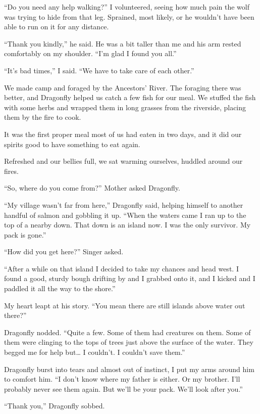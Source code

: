 ``Do you need any help walking?'' I volunteered, seeing how much pain the wolf was trying to hide from that leg. Sprained, most likely, or he wouldn't have been able to run on it for any distance.

``Thank you kindly,'' he said. He was a bit taller than me and his arm rested comfortably on my shoulder. ``I'm glad I found you all.''

``It's bad times,'' I said. ``We have to take care of each other.''

\secdiv

\noindent We made camp and foraged by the Ancestors' River. The foraging there was better, and Dragonfly helped us catch a few fish for our meal. We stuffed the fish with some herbs and wrapped them in long grasses from the riverside, placing them by the fire to cook.

It was the first proper meal most of us had eaten in two days, and it did our spirits good to have something to eat again.

Refreshed and our bellies full, we sat warming ourselves, huddled around our fires.

``So, where do you come from?'' Mother asked Dragonfly.

``My village wasn't far from here,'' Dragonfly said, helping himself to another handful of salmon and gobbling it up. ``When the waters came I ran up to the top of a nearby down. That down is an island now. I was the only survivor. My pack is gone.''

``How did you get here?'' Singer asked.

``After a while on that island I decided to take my chances and head west. I found a good, sturdy bough drifting by and I grabbed onto it, and I kicked and I paddled it all the way to the shore.''

My heart leapt at his story. ``You mean there are still islands above water out there?''

Dragonfly nodded. ``Quite a few. Some of them had creatures on them. Some of them were clinging to the tops of trees just above the surface of the water. They begged me for help but\ldots{} I couldn't. I couldn't save them.''

Dragonfly burst into tears and almost out of instinct, I put my arms around him to comfort him. ``I don't know where my father is either. Or my brother. I'll probably never see them again. But we'll be your pack. We'll look after you.''

``Thank you,'' Dragonfly sobbed.

